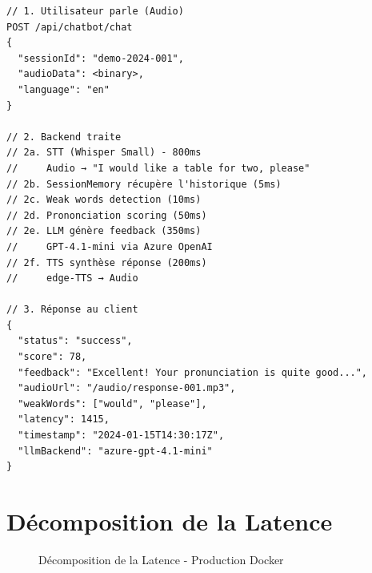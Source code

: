 \documentclass[12pt,a4paper,oneside]{report}
\begin{document}
\begin{lstlisting}[caption=Flux Complet - Requête et Réponse,label=lst:full_flow]
// 1. Utilisateur parle (Audio)
POST /api/chatbot/chat
{
  "sessionId": "demo-2024-001",
  "audioData": <binary>,
  "language": "en"
}

// 2. Backend traite
// 2a. STT (Whisper Small) - 800ms
//     Audio → "I would like a table for two, please"
// 2b. SessionMemory récupère l'historique (5ms)
// 2c. Weak words detection (10ms)
// 2d. Prononciation scoring (50ms)
// 2e. LLM génère feedback (350ms)
//     GPT-4.1-mini via Azure OpenAI
// 2f. TTS synthèse réponse (200ms)
//     edge-TTS → Audio

// 3. Réponse au client
{
  "status": "success",
  "score": 78,
  "feedback": "Excellent! Your pronunciation is quite good...",
  "audioUrl": "/audio/response-001.mp3",
  "weakWords": ["would", "please"],
  "latency": 1415,
  "timestamp": "2024-01-15T14:30:17Z",
  "llmBackend": "azure-gpt-4.1-mini"
}
\end{lstlisting}

\section{Décomposition de la Latence}

\begin{figure}[H]
\centering
{}
\caption{Décomposition de la Latence - Production Docker}
\label{fig:latency_breakdown}
\end{figure}
\end{document}
